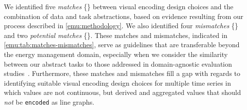 We identified five {\it matches} \{\match\} between visual encoding design choices and the combination of data and task abstractions, based on evidence resulting from our process described in \autoref{emu:methodology}. 
We also identified four {\it mismatches} \{\mismatch\} and two {\it potential matches} \{\posmatch\}. 
These matches and mismatches, indicated in \autoref{emu:tab:matches-mismatches}, serve as guidelines that are transferable beyond the energy management domain, especially when we consider the similarity between our abstract tasks to those addressed in domain-agnostic evaluation studies~\cite{Albers2014,Javed2010}.
Furthermore, these matches and mismatches fill a gap with regards to identifying suitable visual encoding design choices for multiple time series in which values are not continuous, but derived and aggregated values that should {\it not} be {\tt encoded} as line graphs.


